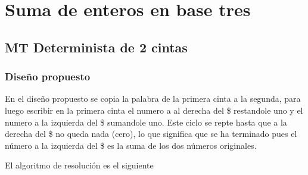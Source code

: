 \section{Suma de enteros en base tres}


\subsection{MT Determinista de 2 cintas}

\subsubsection*{Diseño propuesto}

En el diseño propuesto se copia la palabra de la primera cinta a la segunda, para luego escribir en la primera cinta el numero a al derecha del \$ restandole uno y el numero a la izquierda del \$ sumandole uno. Este ciclo se repte hasta que a la derecha del \$ no queda nada (cero), lo que significa que se ha terminado pues el número a la izquierda del \$ es la suma de los dos números originales.\medskip

El algoritmo de resolución es el siguiente

